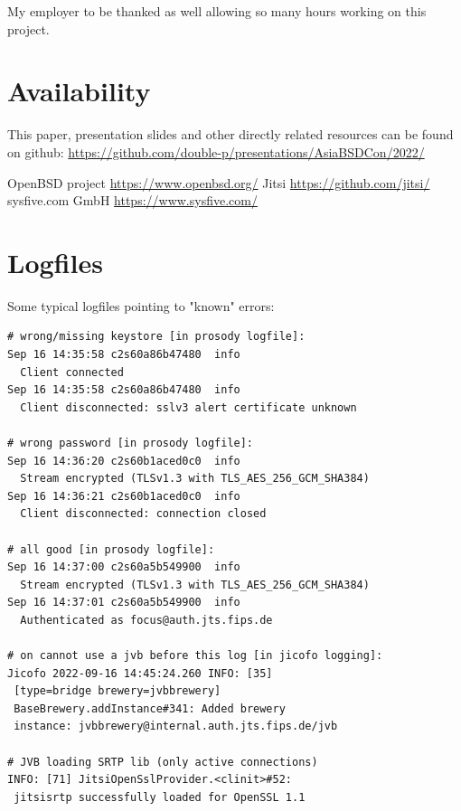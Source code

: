 \documentclass[conference]{IEEEtran}
\begin{document}
My employer to be thanked as well allowing so many hours working on this project.


\section{Availability}
This paper, presentation slides and other directly related resources can be found on github:
\url{https://github.com/double-p/presentations/AsiaBSDCon/2022/}


\begin{thebibliography}{00}
 OpenBSD project \url{https://www.openbsd.org/}
 Jitsi \url{https://github.com/jitsi/}
 sysfive.com GmbH \url{https://www.sysfive.com/}
\end{thebibliography}

\section{Logfiles}
Some typical logfiles pointing to "known" errors:
\begin{verbatim}
# wrong/missing keystore [in prosody logfile]:
Sep 16 14:35:58 c2s60a86b47480  info    
  Client connected
Sep 16 14:35:58 c2s60a86b47480  info    
  Client disconnected: sslv3 alert certificate unknown

# wrong password [in prosody logfile]:
Sep 16 14:36:20 c2s60b1aced0c0  info    
  Stream encrypted (TLSv1.3 with TLS_AES_256_GCM_SHA384)
Sep 16 14:36:21 c2s60b1aced0c0  info    
  Client disconnected: connection closed

# all good [in prosody logfile]:
Sep 16 14:37:00 c2s60a5b549900  info    
  Stream encrypted (TLSv1.3 with TLS_AES_256_GCM_SHA384)
Sep 16 14:37:01 c2s60a5b549900  info    
  Authenticated as focus@auth.jts.fips.de

# on cannot use a jvb before this log [in jicofo logging]:
Jicofo 2022-09-16 14:45:24.260 INFO: [35] 
 [type=bridge brewery=jvbbrewery] 
 BaseBrewery.addInstance#341: Added brewery 
 instance: jvbbrewery@internal.auth.jts.fips.de/jvb
 
# JVB loading SRTP lib (only active connections)
INFO: [71] JitsiOpenSslProvider.<clinit>#52: 
 jitsisrtp successfully loaded for OpenSSL 1.1
\end{verbatim}
\end{document}
